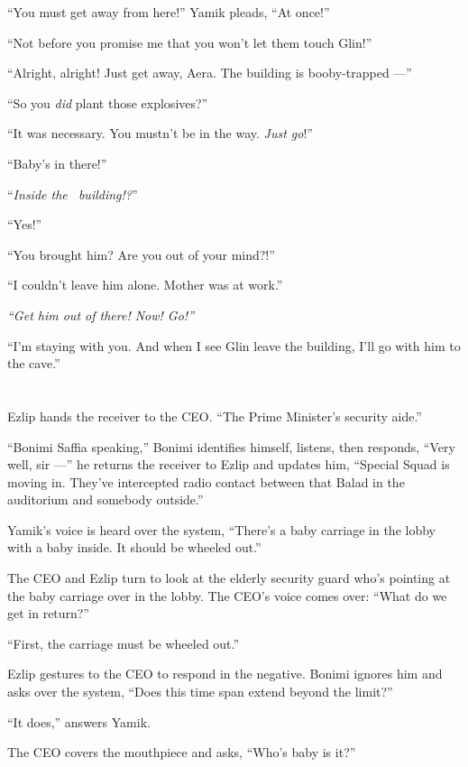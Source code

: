 \documentclass[twoside,11pt,openany]{book}
\begin{document}
``You must get away from here!'' Yamik pleads, ``At
once!''

``Not before you promise me that you won't let them touch Glin!''

``Alright, alright! Just get away, Aera{. T}he building is
booby-trapped ---''

``So you \textit{did}{ }plant those explosives?''

``It was necessary.
You mustn't be in the way. \textit{Just go}!''

``Baby's in there!''

``\textit{Inside the~ building!?}''

``Yes!''

``You brought him? Are you out of your mind?!''

``I couldn't leave him alone{. } Mother was at
work.''

\textit{``Get him out of there! Now! Go!'' }

``I'm staying with you. And when I see Glin leave the building, I'll go with him to the
cave.''



\chapter{}

Ezlip hands the receiver to the CEO. ``The Prime Minister's security aide.''

``Bonimi Saffia speaking,'' Bonimi identifies himself, listens, then responds,
``Very well, sir ---'' he returns the receiver to Ezlip and updates him, ``Special
Squad is moving in. They've intercepted radio contact between that Balad in the auditorium and somebody
outside.''

Yamik's voice is heard over the system, ``There's a baby carriage in the lobby with a baby inside. It
should be wheeled out.''

The CEO and Ezlip turn to look at the elderly security{ }guard who's pointing
at the baby carriage over in the lobby. The CEO's voice comes over: ``What do we get in
return?''

``First, the carriage must be wheeled out.''

Ezlip gestures to the CEO to respond in the negative. Bonimi ignores him and asks over the system, ``Does
this time span extend beyond the limit?''

``It does,'' answers Yamik{.}

The CEO covers the mouthpiece and asks, ``Who's baby is it?''
\end{document}
